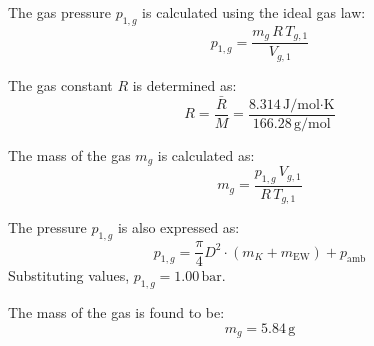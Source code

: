 The gas pressure \( p_{1,g} \) is calculated using the ideal gas law:  
\[
p_{1,g} = \frac{m_g \, R \, T_{g,1}}{V_{g,1}}
\]  

The gas constant \( R \) is determined as:  
\[
R = \frac{\bar{R}}{M} = \frac{8.314 \, \text{J/mol·K}}{166.28 \, \text{g/mol}}
\]  

The mass of the gas \( m_g \) is calculated as:  
\[
m_g = \frac{p_{1,g} \, V_{g,1}}{R \, T_{g,1}}
\]  

The pressure \( p_{1,g} \) is also expressed as:  
\[
p_{1,g} = \frac{\pi}{4} D^2 \cdot (m_K + m_{\text{EW}}) + p_{\text{amb}}
\]  
Substituting values, \( p_{1,g} = 1.00 \, \text{bar} \).  

The mass of the gas is found to be:  
\[
m_g = 5.84 \, \text{g}
\]